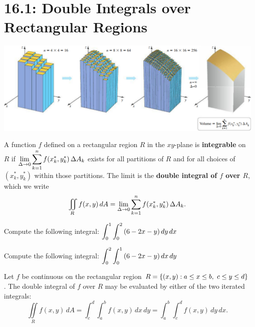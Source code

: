 \documentclass[mathNotesPreamble]{subfiles}
\begin{document}
\section{16.1: Double Integrals over Rectangular Regions}

  \begin{center}
    \includegraphics[width=0.975\linewidth]{images/briggs_16_01/fig16_04}
  \end{center}

  \begin{defn*}
    A function $f$ defined on a rectangular region $R$ in the $xy$-plane is \textbf{integrable} on $R$ if $\displaystyle\lim_{\Delta\to 0} \sum_{k=1}^n f(x_k^*, y_k^*)\, \Delta A_k$ exists for all partitions of $R$ and for all choices of $(x_k^*, y_k^*)$ within those partitions. The limit is the \textbf{double integral of $f$ over $R$}, which we write
      \[\iint\limits_R f(x,y)\,dA=\lim_{\Delta\to 0} \sum_{k=1}^n f(x_k^*, y_k^*)\,\Delta A_k.\]
  \end{defn*}

  \begin{ex*}
    Compute the following integral: $\displaystyle \int_0^1 \int_0^2 {\left(6-2x-y\right)}\,dy\,dx$
  \end{ex*}
  \pagebreak

  \begin{ex*}
    Compute the following integral: $\displaystyle \int_0^2 \int_0^1 {\left(6-2x-y\right)}\,dx\,dy$
  \end{ex*}
  \begin{thmBox*}
    Let $f$ be continuous on the rectangular region $R={\left\{(x,y):a\leq x\leq b,\ c\leq y\leq d\right\}}$. The double integral of $f$ over $R$ may be evaluated by either of the two iterated integrals:
      \[\iint\limits_R f(x,y)\,dA=\int_c^d\int_a^b f(x,y)\,dx\,dy=\int_a^b\int_c^d f(x,y)\,dy\,dx.\]
  \end{thmBox*}
  \pagebreak
\end{document}
